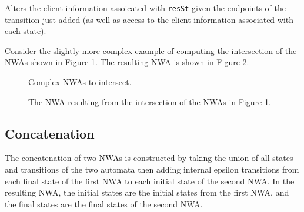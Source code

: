 \begin{functionlist}
    Alters the client information assoicated with \texttt{resSt} given the
    endpoints of the transition just added (as well as access to the client
    information associated with each state).

\end{functionlist}


Consider the slightly more complex example of computing the intersection of
the NWAs shown in Figure \ref{Fi:Intersect3}.  The resulting NWA is shown in
Figure \ref{Fi:Intersect4}.

\begin{figure}[p]
  \centering
  \caption{Complex NWAs to intersect.}
  \label{Fi:Intersect3}
\end{figure}

\begin{figure}[p]
  \centering
  \caption{The NWA resulting from the intersection of the NWAs in Figure \ref{Fi:Intersect3}.}
  \label{Fi:Intersect4}
\end{figure}



\subsection{Concatenation}
\label{Se:Concatenation}

The concatenation of two NWAs is constructed by taking the union of all
states and transitions of the two automata then adding
internal epsilon transitions from each final state of the first NWA to each
initial state of the second NWA.  In the resulting NWA, the initial states
are the initial states from the first NWA, and the final states are the final
states of the second NWA. %


